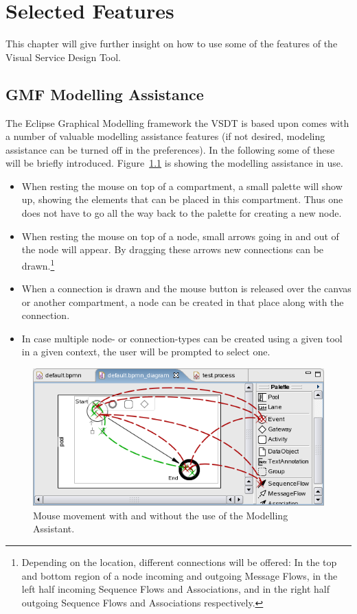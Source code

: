 \chapter{Selected Features}
\label{sec:user_features}

This chapter will give further insight on how to use some of the features of the
Visual Service Design Tool.


\section{GMF Modelling Assistance}
\label{sec:user_features_assistance}

The Eclipse Graphical Modelling framework the VSDT is based upon comes with a
number of valuable modelling assistance features (if not desired, modeling
assistance can be turned off in the preferences).  In the following some of these
will be briefly introduced.  Figure~\ref{fig:modAss} is showing the modelling
assistance in use.

\begin{itemize}
	\item When resting the mouse on top of a compartment, a small palette will
	show up, showing the elements that can be placed in this compartment.  Thus
	one does not have to go all the way back to the palette for creating a new
	node.
	
	\item When resting the mouse on top of a node, small arrows going in and out
	of the node will appear.  By dragging these arrows new connections can be
	drawn.\footnote{Depending on the location, different connections will be
	offered: In the top and bottom region of a node incoming and outgoing Message
	Flows, in the left half incoming Sequence Flows and Associations, and in the
	right half outgoing Sequence Flows and Associations respectively.}
	
	\item When a connection is drawn and the mouse button is released over the
	canvas or another compartment, a node can be created in that place along with
	the connection.
	
	\item In case multiple node- or connection-types can be created using a given
	tool in a given context, the user will be prompted to select one.
\end{itemize}

\begin{figure}[ht]
	\centering
	\includegraphics[width=.5\textwidth]{figures/features/modellingAssistant.png}
	\caption{Mouse movement with and without the use of the Modelling Assistant.}
	\label{fig:modAss}
\end{figure}


